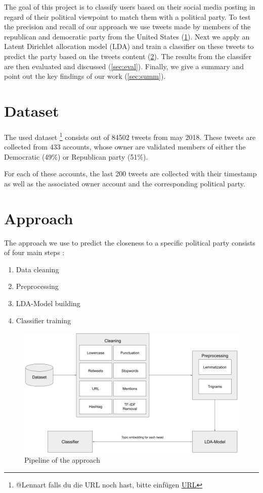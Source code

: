 \documentclass[sigconf, nonacm]{acmart}
\begin{document}
The goal of this project is to classify users based on their social media posting
in regard of their political viewpoint to match them with a political party. To test the precision and recall of our approach we use tweets made by
members of the republican and democratic party from the United States (\ref{sec:data}).
Next we apply an Latent Dirichlet allocation model (LDA) and train a classifier on these tweets to predict the party based on the tweets content (\ref{sec:app}). The results from the classifer are then evaluated and discussed (\ref{sec:eval}). Finally, we give a summary and point out the key findings of our work (\ref{sec:summ}).

\section{Dataset}
\label{sec:data}
The used dataset \footnote{@Lennart falls du die URL noch hast, bitte einfügen \url{URL}} consists out of 84502 tweets from may 2018. These tweets are collected from 433 accounts, whose owner are validated members of either the Democratic (49\%) or Republican party (51\%).

For each of these accounts, the last 200 tweets are collected with their timestamp as well as the associated owner account and the corresponding political party.

\section{Approach}
\label{sec:app}
The approach we use to predict the closeness to a specific political party consists of four main steps :

\begin{enumerate}
	\item Data cleaning
	\item Preprocessing
	\item LDA-Model building
	\item Classifier training
\end{enumerate}

\begin{figure}
	\centering
	\includegraphics[width=\linewidth]{figures/pipeline}
	\caption{Pipeline of the approach}
	\label{fig:pipeline}
\end{figure}
\end{document}
